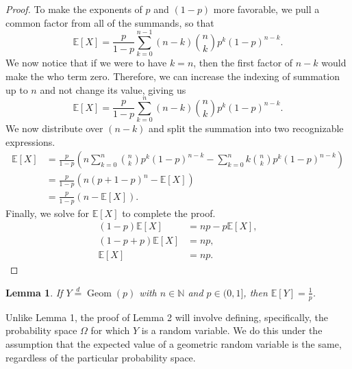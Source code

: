 \documentclass[12pt]{article}
\newtheorem{lemma}{Lemma}
\newcommand{\ds}{\displaystyle}
\newcommand{\N}{\mathbb{N}} %
\newcommand{\E}{\mathbb{E}} %
\newcommand{\<}{\left\langle} %
\renewcommand{\>}{\right\rangle} %
\begin{document}
\begin{proof}
    To make the exponents of $p$ and $(1 - p)$ more favorable, we pull a common factor from all of the summands, so that
    \[\E[X] = \frac{p}{1 - p} \sum_{k = 0}^{n - 1} (n - k) \binom{n}{k} p^k (1-p)^{n - k}.\]
    We now notice that if we were to have $k = n$, then the first factor of $n - k$ would make the who term zero. Therefore, we can increase the indexing of summation up to $n$ and not change its value, giving us
    \[\E[X] = \frac{p}{1 - p} \sum_{k = 0}^n (n - k) \binom{n}{k} p^k (1-p)^{n - k}.\]
    We now distribute over $(n - k)$ and split the summation into two recognizable expressions.
    \begin{align*}
        \E[X]
            &= \frac{p}{1 - p} \left( n \sum_{k = 0}^n \binom{n}{k} p^k (1-p)^{n - k} - \sum_{k = 0}^n k \binom{n}{k} p^k (1-p)^{n - k} \right) \\[1em]
            &= \frac{p}{1 - p} \left( n (p + 1 - p)^n - \E[X] \right) \\[1em]
            &= \frac{p}{1 - p} (n - \E[X]).
    \end{align*}
    Finally, we solve for $\E[X]$ to complete the proof.
    \begin{align*}
        (1 - p) \E[X] &= np - p\E[X], \\[1em]
        (1 - p + p) \E[X] &= np, \\[1em]
        \E[X] &= np.
    \end{align*}
    
\end{proof}

\newpage
\begin{lemma}
    If $Y \overset{d}{=} \operatorname{Geom}(p)$ with $n\in\N$ and $p\in(0, 1]$, then $\E[Y] = \ds\frac1p$.
\end{lemma}

Unlike Lemma 1, the proof of Lemma 2 will involve defining, specifically, the probability space $\Omega$ for which $Y$ is a random variable. We do this under the assumption that the expected value of a geometric random variable is the same, regardless of the particular probability space.
\end{document}
